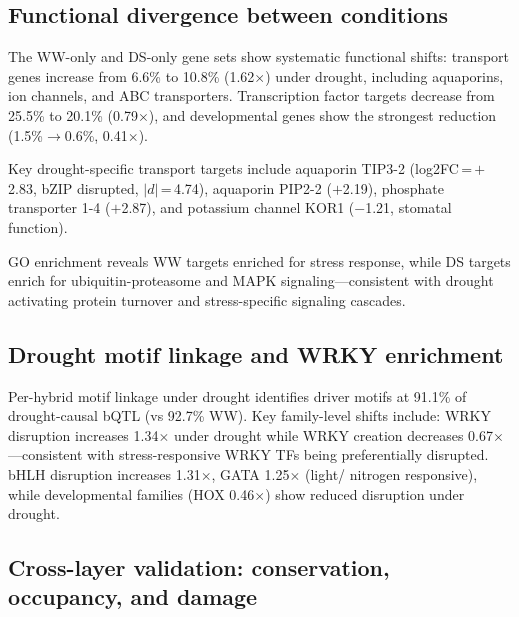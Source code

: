 \documentclass[11pt,a4paper]{article}
\begin{document}
\subsection{Functional divergence between conditions}
\label{sec:functional}

The WW-only and DS-only gene sets show systematic functional shifts:
transport genes increase from 6.6\% to 10.8\% (1.62$\times$) under drought,
including aquaporins, ion channels, and ABC transporters. Transcription factor
targets decrease from 25.5\% to 20.1\% (0.79$\times$), and developmental
genes show the strongest reduction (1.5\%$\to$0.6\%, 0.41$\times$).

Key drought-specific transport targets include aquaporin TIP3-2
(log2FC\,=\,$+$2.83, bZIP disrupted, $|d|$\,=\,4.74), aquaporin PIP2-2
($+$2.19), phosphate transporter 1-4 ($+$2.87), and potassium channel KOR1
($-$1.21, stomatal function).

GO enrichment reveals WW targets enriched for stress response, while DS
targets enrich for ubiquitin-proteasome and MAPK signaling---consistent with
drought activating protein turnover and stress-specific signaling cascades.


\subsection{Drought motif linkage and WRKY enrichment}

Per-hybrid motif linkage under drought identifies driver motifs at 91.1\% of
drought-causal bQTL (vs 92.7\% WW). Key family-level shifts include: WRKY
disruption increases 1.34$\times$ under drought while WRKY creation decreases
0.67$\times$---consistent with stress-responsive WRKY TFs being preferentially
disrupted. bHLH disruption increases 1.31$\times$, GATA 1.25$\times$ (light/
nitrogen responsive), while developmental families (HOX 0.46$\times$) show
reduced disruption under drought.


\subsection{Cross-layer validation: conservation, occupancy, and damage}
\label{sec:crosslayer}
\end{document}
